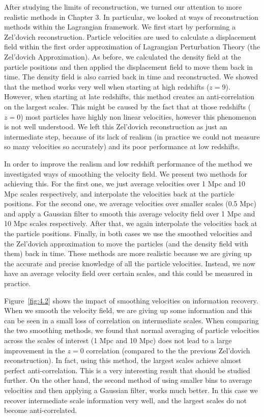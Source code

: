 After studying the limits of reconstruction, we turned our attention to more realistic methods in Chapter 3. In particular, we looked at ways of reconstruction methods within the Lagrangian framework. We first start by performing a Zel'dovich reconstruction. Particle velocities are used to calculate a displacement field within the first order approximation of Lagrangian Perturbation Theory (the Zel'dovich Approximation). As before, we calculated the density field at the particle positions and then applied the displacement field to move them back in time. The density field is also carried back in time and reconstructed. We showed that the method works very well when starting at high redshifts ($z=9$). However, when starting at late redshifts, this method creates an anti-correlation on the largest scales. This might be caused by the fact that at those redshifts ($z=0$) most particles have highly non linear velocities, however this phenomenon is not well understood. We left this Zel'dovich reconstruction as just an intermediate step, because of its lack of realism (in practice we could not measure so many velocities so accurately) and its poor performance at low redshifts.

In order to improve the realism and low redshift performance of the method we investigated ways of smoothing the velocity field. We present two methods for achieving this. For the first one, we just average velocities over 1 Mpc and 10 Mpc scales respectively, and interpolate the velocities back at the particle positions. For the second one, we average velocities over smaller scales (0.5 Mpc) and apply a Gaussian filter to smooth this average velocity field over 1 Mpc and 10 Mpc scales respectively. After that, we again interpolate the velocities back at the particle positions. Finally, in both cases we use the smoothed velocities and the Zel'dovich approximation to move the particles (and the density field with them) back in time. These methods are more realistic because we are giving up the accurate and precise knowledge of all the particle velocities. Instead, we now have an average velocity field over certain scales, and this could be measured in practice. 

Figure~\ref{fig:4.2} shows the impact of smoothing velocities on information recovery. When we smooth the velocity field, we are giving up some information and this can be seen in a small loss of correlation on intermediate scales. When comparing the two smoothing methods, we found that normal averaging of particle velocities across the scales of interest (1 Mpc and 10 Mpc) does not lead to a large improvement in the $z=0$ correlation (compared to the the previous Zel'dovich reconstruction). In fact, using this method, the largest scales achieve almost perfect anti-correlation. This is a very interesting result that should be studied further. On the other hand, the second method of using smaller bins to average velocities and then applying a Gaussian filter, works much better. In this case we recover intermediate scale information very well, and the largest scales do not become anti-correlated.

